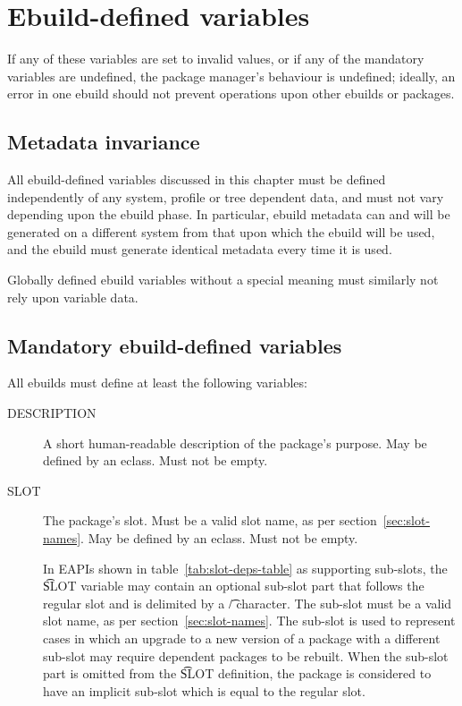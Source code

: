 \chapter{Ebuild-defined variables}
\label{ch:ebuild-vars}


If any of these variables are set to invalid values, or if any of the mandatory variables are
undefined, the package manager's behaviour is undefined; ideally, an error in one ebuild should not
prevent operations upon other ebuilds or packages.

\section{Metadata invariance}
\label{sec:metadata-invariance}

All ebuild-defined variables discussed in this chapter must be defined independently of
any system, profile or tree dependent data, and must not vary depending upon the ebuild
phase. In particular, ebuild metadata can and will be generated on a different system from that upon
which the ebuild will be used, and the ebuild must generate identical metadata every time it
is used.

Globally defined ebuild variables without a special meaning must similarly not rely upon
variable data.

\section{Mandatory ebuild-defined variables}
\label{sec:mandatory-vars}

All ebuilds must define at least the following variables:
\nobreakpar
\begin{description}
\item[DESCRIPTION] A short human-readable description of the package's purpose. May be defined by an
    eclass. Must not be empty.
\item[SLOT] The package's slot. Must be a valid slot name, as per section~\ref{sec:slot-names}.
    May be defined by an eclass. Must not be empty.

    In EAPIs shown in table~\ref{tab:slot-deps-table} as supporting sub-slots, the \t{SLOT} variable
    may contain an optional sub-slot part that follows the regular slot and is delimited by a \t{/}
    character. The sub-slot must be a valid slot name, as per section~\ref{sec:slot-names}.
    The sub-slot is used to represent cases in which an upgrade to a new version of a package with
    a different sub-slot may require dependent packages to be rebuilt. When the sub-slot part is
    omitted from the \t{SLOT} definition, the package is considered to have an implicit sub-slot
    which is equal to the regular slot.
\end{description}

